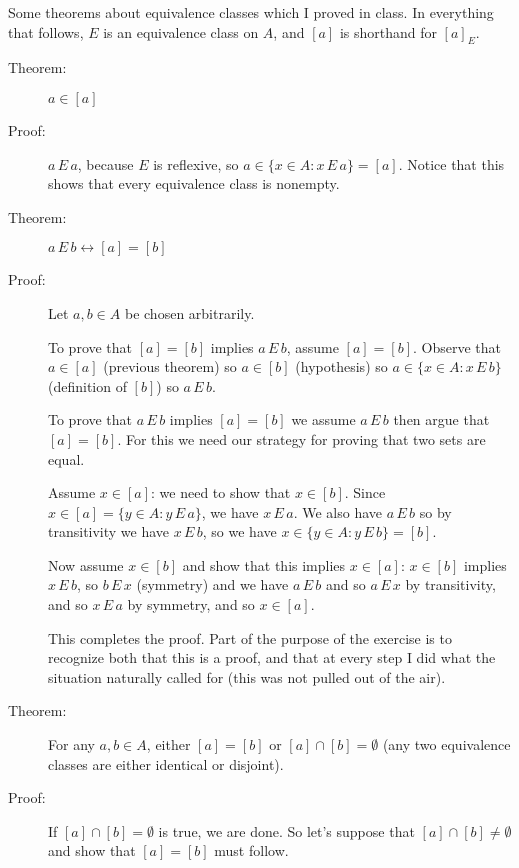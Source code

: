\documentclass[12pt]{article}
\begin{document}
Some theorems about equivalence classes which I proved in class.  In everything that follows, $E$ is an equivalence class on $A$, and $[a]$ is shorthand for $[a]_E$.

\begin{description}

\item[Theorem:]  $a \in [a]$

\item[Proof:]  $a \, E \,a$, because $E$ is reflexive, so $a \in \{x\in A:x \, E \, a\}=[a]$.  Notice that this shows that every equivalence class is nonempty.

\item[Theorem:]   $a \, E \, b \leftrightarrow [a] = [b]$

\item [Proof:]  Let $a,b \in A$ be chosen arbitrarily.

To prove that $[a]=[b]$ implies $a \,E\, b$, assume $[a]=[b]$.  Observe that $a \in [a]$ (previous theorem) so $a \in [b]$ (hypothesis) so $a \in \{x \in A:x \, E\, b\}$ (definition of $[b]$) so $a \,E\,b$.

To prove that $a\,E\,b$ implies $[a]=[b]$ we assume $a \, E\,b$ then argue that $[a]=[b]$.  For this we need our strategy for proving that two sets are equal.  

Assume $x \in [a]$:  we need to show that $x \in [b]$.  Since $x \in [a] = \{y \in A:y\, E \, a\}$, we have $x \, E\, a$.  We also have $a \, E \, b$ so by transitivity we have $x \, E \, b$, so we have $x \in \{y \in A:y \, E\, b\} = [b]$.  

Now assume $x \in [b]$ and show that this implies $x \in [a]$:  $x \in [b]$ implies $x \, E \, b$, so $b \, E \, x$ (symmetry) and we have $a \, E \, b$ and so $a \, E \, x$ by transitivity, and so $x \, E \, a$ by symmetry, and so $x \in [a]$.

This completes the proof.  Part of the purpose of the exercise is to recognize both that this is a proof, and that at every step I did what the situation naturally called for (this was not pulled out of the air).

\item[Theorem:]  For any $a,b \in A$, either $[a]=[b]$ or $[a] \cap [b] = \emptyset$ (any two equivalence classes are either identical or disjoint).

\item[Proof:]  If $[a] \cap [b] = \emptyset$  is true, we are done.  So let's suppose that $[a] \cap [b] \neq  \emptyset$ and show that $[a]=[b]$ must follow.


\end{description}
\end{document}
